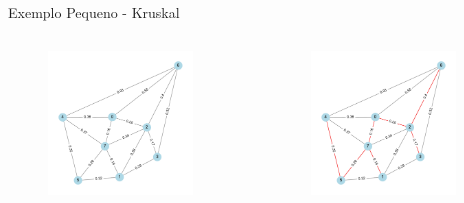 \documentclass[aspectratio=169,usenames,dvipsnames]{beamer}
\begin{document}
\begin{frame}{Exemplo Pequeno - Kruskal}
    \begin{columns}
    \begin{figure}[ht]
    \centering
        \includegraphics[width=0.9\textwidth]{figs/exemplo_0.pdf}
    \end{figure}
        \begin{figure}[ht]
        \centering
            \includegraphics[width=0.9\textwidth]{figs/exemplo_0_kruskal.pdf}
        \end{figure}
    \end{columns}
\end{frame}
\end{document}
